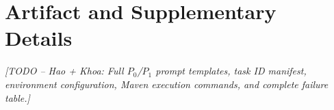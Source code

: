 
\appendices
\section{Artifact and Supplementary Details}
\label{sec:appendix}
\emph{[TODO -- Hao + Khoa: Full $P_0$/$P_1$ prompt templates, task ID manifest, environment configuration, Maven execution commands, and complete failure table.]}
